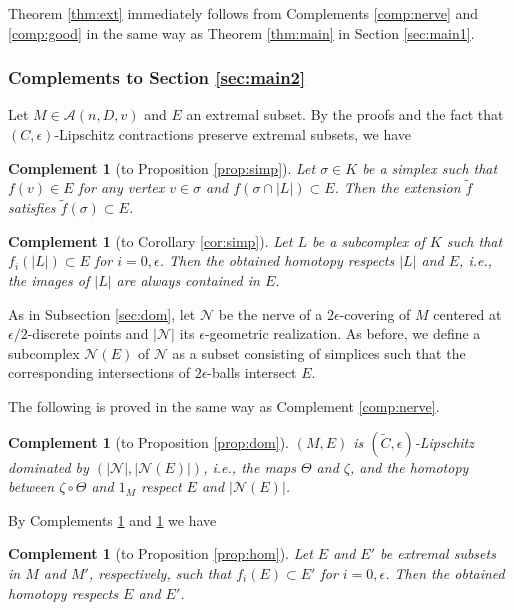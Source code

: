 \documentclass[a4paper,12pt]{amsart}
\theoremstyle{plain}
\newtheorem{comp}[thm]{Complement}
\theoremstyle{definition}
\numberwithin{thm}{section}
\numberwithin{equation}{section}
\begin{document}
Theorem \ref{thm:ext} immediately follows from Complements \ref{comp:nerve} and \ref{comp:good} in the same way as Theorem \ref{thm:main} in Section \ref{sec:main1}.

\subsubsection{Complements to Section \ref{sec:main2}}

Let $M\in\mathcal A(n,D,v)$ and $E$ an extremal subset.
By the proofs and the fact that $(C,\epsilon)$-Lipschitz contractions preserve extremal subsets, we have

\begin{comp}[to Proposition \ref{prop:simp}]\label{comp:simp}
Let $\sigma\in K$ be a simplex such that $f(v)\in E$ for any vertex $v\in\sigma$ and $f(\sigma\cap|L|)\subset E$.
Then the extension $\tilde f$ satisfies $\tilde f(\sigma)\subset E$.
\end{comp}

\begin{comp}[to Corollary \ref{cor:simp}]\label{comp:simp'}
Let $L$ be a subcomplex of $K$ such that $f_i(|L|)\subset E$ for $i=0,\epsilon$.
Then the obtained homotopy respects $|L|$ and $E$, i.e., the images of $|L|$ are always contained in $E$.
\end{comp}

As in Subsection \ref{sec:dom}, let $\mathcal N$ be the nerve of a $2\epsilon$-covering of $M$ centered at $\epsilon/2$-discrete points and $|\mathcal N|$ its $\epsilon$-geometric realization.
As before, we define a subcomplex $\mathcal N(E)$ of $\mathcal N$ as a subset consisting of simplices such that the corresponding intersections of $2\epsilon$-balls intersect $E$.

The following is proved in the same way as Complement \ref{comp:nerve}.

\begin{comp}[to Proposition \ref{prop:dom}]\label{comp:dom}
$(M,E)$ is $(\tilde C,\epsilon)$-Lipschitz dominated by $(|\mathcal N|,|\mathcal N(E)|)$, i.e., the maps $\Theta$ and $\zeta$, and the homotopy between $\zeta\circ\Theta$ and $1_M$ respect $E$ and $|\mathcal N(E)|$.
\end{comp}

By Complements \ref{comp:simp'} and \ref{comp:dom} we have

\begin{comp}[to Proposition \ref{prop:hom}]\label{comp:hom}
Let $E$ and $E'$ be extremal subsets in $M$ and $M'$, respectively, such that $f_i(E)\subset E'$ for $i=0,\epsilon$.
Then the obtained homotopy respects $E$ and $E'$.
\end{comp}
\end{document}
